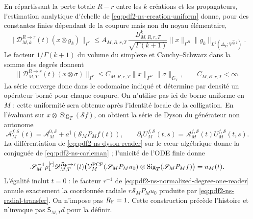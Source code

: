 En répartissant la perte totale $R-r$ entre les $k$ créations et les propagateurs,
l'estimation analytique d'échelle de
\eqref{eq:pdf2-ns-creation-uniform} donne, pour des constantes finies dépendant de la
coupure mais non du noyau élémentaire,
\begin{equation}\label{eq:pdf2-ns-dyson-homogeneous-bound}
 \|\mathscr D_{M,k}^{R\to r}(t)(x\otimes g_k)\|_{\Gamma^r}
 \le A_{M,R,r,T}\,
 \frac{B_{M,R,r,T}^{k}}{\sqrt{\Gamma(k+1)}}
 \|x\|_{\Gamma^R}\|g_k\|_{L^2(\Delta_k;V^{\widehat\otimes k})}.
\end{equation}
Le facteur $1/\Gamma(k+1)$ du volume du simplexe et Cauchy--Schwarz dans la
somme des degrés donnent
\begin{equation}\label{eq:pdf2-ns-dyson-bound}
 \|\mathscr D_{M,T}^{R\to r}(t)(x\otimes\sigma)\|_{\Gamma^r}
 \le C_{M,R,r,T}\|x\|_{\Gamma^R}\|\sigma\|_{\mathfrak S_T},
 \qquad C_{M,R,r,T}<\infty.
\end{equation}
La série converge donc dans le codomaine indiqué et détermine par densité
un opérateur borné pour chaque coupure. On n'utilise pas ici de borne uniforme en $M$ :
cette uniformité sera obtenue après l'identité locale de la colligation.
En l'évaluant sur
$x\otimes\operatorname{Sig}_T(\mathscr Sf)$, on obtient la série de Dyson du générateur non
autonome
\begin{equation}\label{eq:pdf2-ns-nonautonomous-generator}
 \mathcal A_M^{f,\mathscr S}(t)
 =\mathcal A_M^{0,\mathscr S}+a^\dagger(\mathscr S_MP_Mf(t)),
 \qquad
 \partial_tU_M^{f,\mathscr S}(t,s)
 =\mathcal A_M^{f,\mathscr S}(t)U_M^{f,\mathscr S}(t,s).
\end{equation}
La différentiation de \eqref{eq:pdf2-ns-dyson-reader} sur le cœur algébrique donne
la conjuguée de \eqref{eq:pdf2-ns-carleman} ; l'unicité de l'ODE finie donne
\begin{equation}\label{eq:pdf2-ns-dyson-degree-one}
 \mathscr S_M^{-1}\rho^{[r]}_1
 \mathscr D_{M,T}^{R_{\rm F}\to r}(t)
 \bigl(\mathcal V_M^{\rm PCF}(\mathscr S_MP_Mu_0)
       \otimes\operatorname{Sig}_T(\mathscr S_MP_Mf)\bigr)
 =u_M(t).
\end{equation}
L'égalité inclut $t=0$ : le facteur $r^{-1}$ de
\eqref{eq:pdf2-ns-normalized-degree-one-reader} annule exactement la
coordonnée radiale $r\mathscr S_MP_Mu_0$ produite par
\eqref{eq:pdf2-ns-radial-transfer}. On n'impose pas $R_{\rm F}=1$.
Cette construction précède l'histoire et n'invoque pas
$\mathsf S_{M,T}d$ pour la définir.

